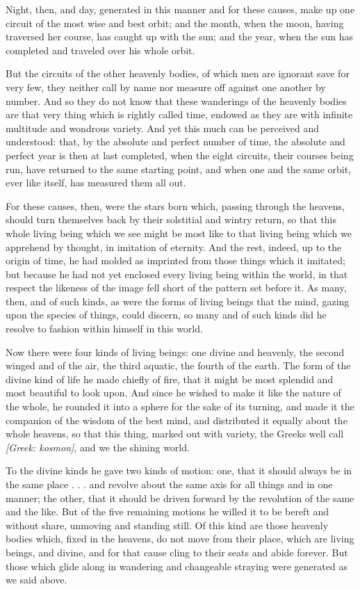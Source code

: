  Night, then, and day, generated in this manner and for these causes, make up one circuit of the most wise and best orbit; and the month, when the moon, having traversed her course, has caught up with the sun; and the year, when the sun has completed and traveled over his whole orbit.

 But the circuits of the other heavenly bodies, of which men are ignorant save for very few, they neither call by name nor measure off against one another by number. And so they do not know that these wanderings of the heavenly bodies are that very thing which is rightly called time, endowed as they are with infinite multitude and wondrous variety. And yet this much can be perceived and understood: that, by the absolute and perfect number of time, the absolute and perfect year is then at last completed, when the eight circuits, their courses being run, have returned to the same starting point, and when one and the same orbit, ever like itself, has measured them all out.

 For these causes, then, were the stars born which, passing through the heavens, should turn themselves back by their solstitial and wintry return, so that this whole living being which we see might be most like to that living being which we apprehend by thought, in imitation of eternity. And the rest, indeed, up to the origin of time, he had molded as imprinted from those things which it imitated; but because he had not yet enclosed every living being within the world, in that respect the likeness of the image fell short of the pattern set before it. As many, then, and of such kinds, as were the forms of living beings that the mind, gazing upon the species of things, could discern, so many and of such kinds did he resolve to fashion within himself in this world.

 Now there were four kinds of living beings: one divine and heavenly, the second winged and of the air, the third aquatic, the fourth of the earth. The form of the divine kind of life he made chiefly of fire, that it might be most splendid and most beautiful to look upon. And since he wished to make it like the nature of the whole, he rounded it into a sphere for the sake of its turning, and made it the companion of the wisdom of the best mind, and distributed it equally about the whole heavens, so that this thing, marked out with variety, the Greeks well call \textit{[Greek: kosmon]}, and we the shining world.

 To the divine kinds he gave two kinds of motion: one, that it should always be in the same place . . . and revolve about the same axis for all things and in one manner; the other, that it should be driven forward by the revolution of the same and the like. But of the five remaining motions he willed it to be bereft and without share, unmoving and standing still. Of this kind are those heavenly bodies which, fixed in the heavens, do not move from their place, which are living beings, and divine, and for that cause cling to their seats and abide forever. But those which glide along in wandering and changeable straying were generated as we said above.

